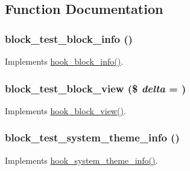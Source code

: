 \subsection{Function Documentation}
\hypertarget{block__test_8module_add8679243e7d2208ffdaf38097558dd8}{
\subsubsection[{block\_\-test\_\-block\_\-info}]{\setlength{\rightskip}{0pt plus 5cm}block\_\-test\_\-block\_\-info ()}}
\label{block__test_8module_add8679243e7d2208ffdaf38097558dd8}
Implements \hyperlink{group__hooks_ga2bd926c3e90deeba0c3ba64fb3c64d73}{hook\_\-block\_\-info()}. \hypertarget{block__test_8module_a2808d4c86bd2fad491f69450b2d0fcac}{
\subsubsection[{block\_\-test\_\-block\_\-view}]{\setlength{\rightskip}{0pt plus 5cm}block\_\-test\_\-block\_\-view (\$ {\em delta} = {})}}
\label{block__test_8module_a2808d4c86bd2fad491f69450b2d0fcac}
Implements \hyperlink{group__hooks_gaa14092a3e74cdc57aa295100cfd6860d}{hook\_\-block\_\-view()}. \hypertarget{block__test_8module_af17e7e8051b14c1ae4a7e63559d30ec2}{
\subsubsection[{block\_\-test\_\-system\_\-theme\_\-info}]{\setlength{\rightskip}{0pt plus 5cm}block\_\-test\_\-system\_\-theme\_\-info ()}}
\label{block__test_8module_af17e7e8051b14c1ae4a7e63559d30ec2}
Implements \hyperlink{group__hooks_gaf21de71044d5a79bde481d2383e12c9a}{hook\_\-system\_\-theme\_\-info()}. 